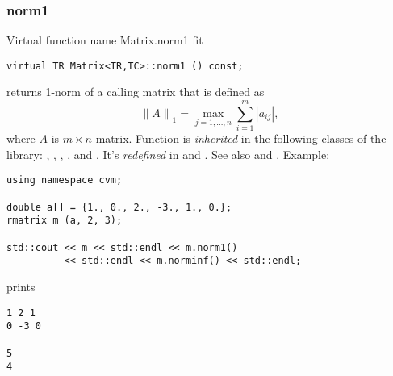 \subsubsection{norm1}
Virtual function%
\pdfdest name {Matrix.norm1} fit
\begin{verbatim}
virtual TR Matrix<TR,TC>::norm1 () const;
\end{verbatim}
returns  1-norm of a calling matrix that is defined as
\begin{equation*}
{\|A\|}_{1}=\max_{j=1,\dots,n} \sum_{i=1}^{m} |a_{ij}|,
\end{equation*}
where $A$ is $m\times n$ matrix.
Function is \emph{inherited}
in the following classes of the library:
,   ,
, ,
 and .
It's \emph{redefined} in
 and .
See also  and
.
Example:
\begin{Verbatim}
using namespace cvm;

double a[] = {1., 0., 2., -3., 1., 0.};
rmatrix m (a, 2, 3);

std::cout << m << std::endl << m.norm1() 
          << std::endl << m.norminf() << std::endl;
\end{Verbatim}
prints
\begin{Verbatim}
1 2 1
0 -3 0

5
4
\end{Verbatim}
\newpage





